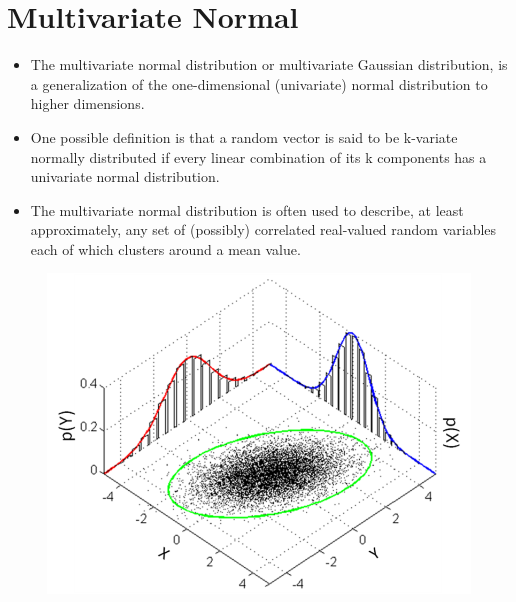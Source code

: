 \documentclass[]{report}
\begin{document}
\section{Multivariate Normal}
{\large
	\begin{itemize}
		\item The multivariate normal distribution or multivariate Gaussian distribution, is a generalization of the one-dimensional (univariate) normal distribution to higher dimensions.\item One possible definition is that a random vector is said to be k-variate normally distributed if every linear combination of its k components has a univariate normal distribution. 
		\item The multivariate normal distribution is often used to describe, at least approximately, any set of (possibly) correlated real-valued random variables each of which clusters around a mean value.
	\end{itemize}
}
\begin{figure}[h!]
	\centering
	\includegraphics[width=0.7\linewidth]{./793px-MultivariateNormal}
	\caption{}
	\label{fig:793px-MultivariateNormal}
\end{figure}
\newpage
\end{document}
